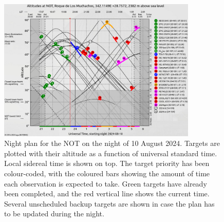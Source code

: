 \documentclass[a4paper,oneside,12pt, class=Latex/Classes/PhDthesisPSnPDF, crop=false]{standalone}
\begin{document}
\begin{figure}
    \centering
    \includegraphics[width=0.844\textwidth]{../Images/chapter_2/visplot.png}
    \caption[Example of a night plan.]{Night plan for the NOT on the night of 10 August 2024. Targets are plotted with their altitude as a function of universal standard time. Local sidereal time is shown on top. The target priority has been colour-coded, with the coloured bars showing the amount of time each observation is expected to take. Green targets have already been completed, and the red vertical line shows the current time. Several unscheduled backup targets are shown in case the plan has to be updated during the night.}
    \label{visplot}
\end{figure}
\end{document}
